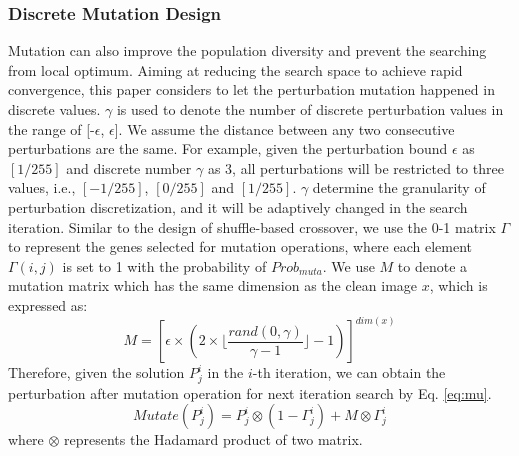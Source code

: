 \documentclass[lettersize,journal]{IEEEtran}
\begin{document}
	\subsubsection{Discrete Mutation Design}
	Mutation can also improve the population diversity and prevent the searching from local optimum. Aiming at reducing the search space to achieve rapid convergence, this paper considers to let the perturbation mutation happened in discrete values. $\gamma$ is used to denote the number of discrete perturbation values in the range of [-$\epsilon$, $\epsilon$]. We assume the distance between any two consecutive perturbations are the same. For example, given the perturbation bound $\epsilon$ as $[1/255]$ and discrete number $\gamma$ as $3$, all perturbations will be restricted to three values, i.e.,  $[-1/255]$, $[0/255]$ and $[1/255]$. $\gamma$ determine the granularity of perturbation discretization, and it will be adaptively changed in the search iteration.
	Similar to the design of shuffle-based crossover, we use the 0-1 matrix $\Gamma$ to represent the genes selected for mutation operations, where each element $\Gamma (i,j)$ is set to 1 with the probability of $Prob_{muta}$.
	We use $M$ to denote a mutation matrix which has the same dimension as the clean image $x$, which is expressed as:
	\begin{equation}
		M=[\epsilon \times(2\times \lfloor \dfrac{ rand(0, \gamma)}{ \gamma-1}\rfloor -1)]^{dim(x)}
	\end{equation} 
	Therefore, given the solution $P^i_j$ in the $i$-th iteration, we can obtain the perturbation after mutation operation for next iteration search by Eq. \ref{eq:mu}.
	\begin{equation}
		\label{eq:mu}
		Mutate (P^{i}_j) = P^i_j \otimes (1 - \Gamma^i_j) + M \otimes \Gamma^i_j  
	\end{equation}
	where $\otimes$ represents the Hadamard product of two matrix.
	
	
	
\end{document}
